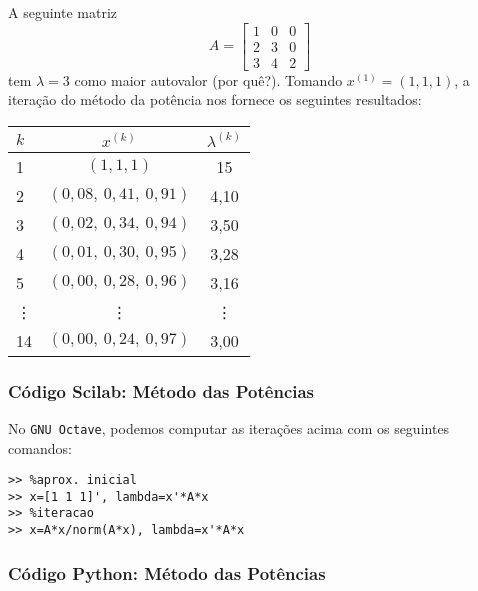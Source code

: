 \begin{ex}
  A seguinte matriz
  \begin{equation}
    A =
    \begin{bmatrix}
      1 & 0 & 0\\
      2 & 3 & 0\\
      3 & 4 & 2
    \end{bmatrix}
  \end{equation}
tem $\lambda=3$ como maior autovalor (por quê?). Tomando $x^{(1)} = (1, 1, 1)$, a iteração do método da potência nos fornece os seguintes resultados:
\begin{center}
  \begin{tabular}{l|c|c}
    $k$ & $x^{(k)}$ & $\lambda^{(k)}$\\\hline
    1   & $(1, 1, 1)$ & 15\\
    2   & $(0,08,~0,41,~0,91)$ & 4,10\\
    3   & $(0,02,~0,34,~0,94)$ & 3,50\\
    4   & $(0,01,~0,30,~0,95)$ & 3,28\\
    5   & $(0,00,~0,28,~0,96)$ & 3,16\\
    \vdots & \vdots & \vdots\\
    14  & $(0,00,~0,24,~0,97)$ & 3,00\\\hline
  \end{tabular}
\end{center}

\ifisscilab
\subsubsection{Código Scilab: Método das Potências}


\fi
\ifisoctave
No \verb+GNU Octave+, podemos computar as iterações acima com os seguintes comandos:
\begin{verbatim}
>> %aprox. inicial
>> x=[1 1 1]', lambda=x'*A*x
>> %iteracao
>> x=A*x/norm(A*x), lambda=x'*A*x
\end{verbatim}
\fi
\ifispython
\subsubsection{Código Python: Método das Potências}


\fi
\end{ex}

